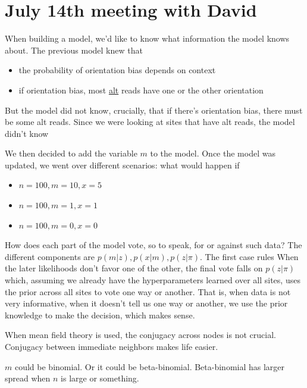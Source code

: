 \documentclass[a4paper]{article}
\begin{document}



\section{July 14th meeting with David}

When building a model, we'd like to know what information the model knows about. The previous model knew that 

\begin{itemize}
\item the probability of orientation bias depends on context
\item if orientation bias, most \underline{alt} reads have one or the other orientation
\end{itemize}

But the model did not know, crucially, that if there's orientation bias, there must be some alt reads. Since we were looking at sites that have alt reads, the model didn't know 

We then decided to add the variable $m$ to the model.  Once the model was updated, we went over different scenarios: what would happen if 
\begin{itemize}
\item $n = 100, m = 10, x = 5$ 
\item $n = 100, m = 1, x = 1$
\item $n = 100, m = 0, x = 0$
\end{itemize}

How does each part of the model vote, so to speak, for or against such data? The different components are $p(m|z), p(x|m), p(z | \pi)$. The first case rules 
When the later likelihoods don't favor one of the other, the final vote falls on $p(z | \pi)$ which, assuming we already have the hyperparameters learned over all sites, uses the prior across all sites to vote one way or another. That is, when data is not very informative, when it doesn't tell us one way or another, we use the prior knowledge to make the decision, which makes sense.

When mean field theory is used, the conjugacy across nodes is not crucial. Conjugacy between immediate neighbors makes life easier.

$m$ could be binomial. Or it could be beta-binomial. Beta-binomial has larger spread when $n$ is large or something. 
\end{document}
